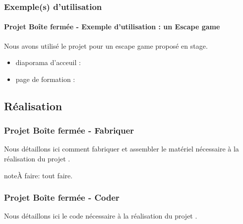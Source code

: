 \documentclass[letterpaper,10pt,french]{sphinxmanual}
\begin{document}
\subsubsection{Exemple(s) d’utilisation}
\label{\detokenize{projets/boite-fermee:exemple-s-d-utilisation}}

\paragraph{Projet Boîte fermée - Exemple d’utilisation : un Escape game}
\label{\detokenize{projets/boite-fermee-exemple-escape::doc}}\label{\detokenize{projets/boite-fermee-exemple-escape:projet-projetboite-exemple-d-utilisation-un-escape-game}}
Nous avons utilisé le projet {\hyperref[\detokenize{projets/boite-fermee:projetboite}]{}} pour un escape
game proposé en stage.
\begin{itemize}
\item {} 
diaporama d’acceuil : 

\item {} 
page de formation : 

\end{itemize}


\subsection{Réalisation}
\label{\detokenize{projets/boite-fermee:realisation}}

\subsubsection{Projet Boîte fermée - Fabriquer}
\label{\detokenize{projets/boite-fermee-fabriquer:projet-projetboite-fabriquer}}\label{\detokenize{projets/boite-fermee-fabriquer::doc}}
Nous détaillons ici comment fabriquer et assembler
le matériel nécessaire à la réalisation du projet
{\hyperref[\detokenize{projets/boite-fermee:projetboite}]{}}.

\begin{sphinxadmonition}{note}{\label{projets/boite-fermee-fabriquer:index-0}À faire:}
tout faire.
\end{sphinxadmonition}


\subsubsection{Projet Boîte fermée - Coder}
\label{\detokenize{projets/boite-fermee-coder:projet-projetboite-coder}}\label{\detokenize{projets/boite-fermee-coder::doc}}
Nous détaillons ici le code nécessaire à la réalisation
du projet {\hyperref[\detokenize{projets/boite-fermee:projetboite}]{}}.
\end{document}
